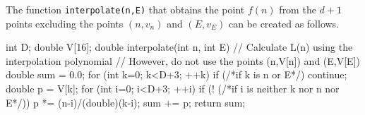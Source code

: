 \begin{versionbeta}

The function \texttt{interpolate(n,E)} that obtains the point $f(n)$ from the $d+1$ points excluding the points $(n,v_n)$ and $(E,v_E)$ can be created as follows.

\begin{cbox}[emph={interpolate}]
int D;
double V[16];
double interpolate(int n, int E) {
    // Calculate L(n) using the interpolation polynomial
    // However, do not use the points (n,V[n]) and (E,V[E])
    double sum = 0.0;
    for (int k=0; k<D+3; ++k) {
        if (/*if k is n or E*/) continue;
        double p = V[k];
        for (int i=0; i<D+3; ++i)
            if (! (/*if i is neither k nor n nor E*/))
                p *= (n-i)/(double)(k-i);
        sum += p;
    }
    return sum;
}
\end{cbox}


\end{versionbeta}
